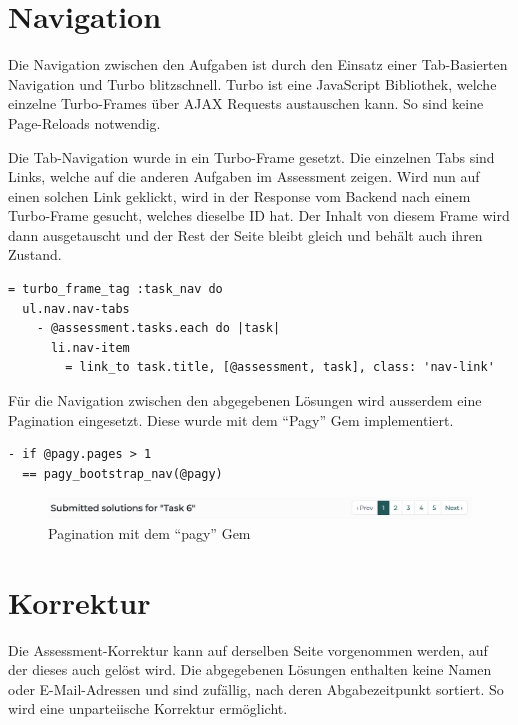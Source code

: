 \section{Navigation}

Die Navigation zwischen den Aufgaben ist durch den Einsatz einer Tab-Basierten Navigation und Turbo blitzschnell.
Turbo ist eine JavaScript Bibliothek, welche einzelne Turbo-Frames über AJAX Requests austauschen kann. So sind keine Page-Reloads notwendig.

Die Tab-Navigation wurde in ein Turbo-Frame gesetzt. Die einzelnen Tabs sind Links, welche auf die anderen Aufgaben im Assessment zeigen.
Wird nun auf einen solchen Link geklickt, wird in der Response vom Backend nach einem Turbo-Frame gesucht, welches dieselbe ID hat. Der Inhalt
von diesem Frame wird dann ausgetauscht und der Rest der Seite bleibt gleich und behält auch ihren Zustand.

\begin{codebox}
\begin{verbatim}
= turbo_frame_tag :task_nav do
  ul.nav.nav-tabs
    - @assessment.tasks.each do |task|
      li.nav-item
        = link_to task.title, [@assessment, task], class: 'nav-link'
\end{verbatim}
\end{codebox}

Für die Navigation zwischen den abgegebenen Lösungen wird ausserdem eine Pagination eingesetzt. Diese wurde mit dem \enquote{Pagy}
Gem implementiert.

\begin{codebox}
\begin{verbatim}
- if @pagy.pages > 1
  == pagy_bootstrap_nav(@pagy)
\end{verbatim}
\end{codebox}

\begin{figure}[H]
  \centering
  \includegraphics[width=\textwidth]{images/ui/pagination.png}
  \caption{\label{fig:pagt}Pagination mit dem \enquote{pagy} Gem}
\end{figure}

\section{Korrektur}

Die Assessment-Korrektur kann auf derselben Seite vorgenommen werden, auf der dieses auch gelöst wird.
Die abgegebenen Lösungen enthalten keine Namen oder E-Mail-Adressen und sind zufällig, nach deren Abgabezeitpunkt
sortiert. So wird eine unparteiische Korrektur ermöglicht.

